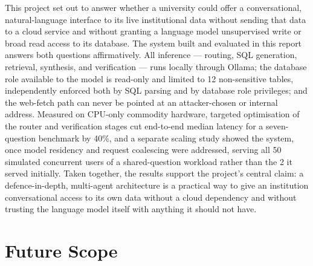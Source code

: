 \documentclass[11pt,a4paper,oneside]{report}
\begin{document}
This project set out to answer whether a university could offer a
conversational, natural-language interface to its live institutional data
without sending that data to a cloud service and without granting a language
model unsupervised write or broad read access to its database. The system
built and evaluated in this report answers both questions affirmatively. All
inference --- routing, SQL generation, retrieval, synthesis, and
verification --- runs locally through Ollama; the database role available to
the model is read-only and limited to 12 non-sensitive tables, independently
enforced both by SQL parsing and by database role privileges; and the
web-fetch path can never be pointed at an attacker-chosen or internal
address. Measured on CPU-only commodity hardware, targeted optimisation of
the router and verification stages cut end-to-end median latency for a
seven-question benchmark by 40\%, and a separate scaling study showed the
system, once model residency and request coalescing were addressed, serving
all 50 simulated concurrent users of a shared-question workload rather than
the 2 it served initially. Taken together, the results support the
project's central claim: a defence-in-depth, multi-agent architecture is a
practical way to give an institution conversational access to its own data
without a cloud dependency and without trusting the language model itself
with anything it should not have.

\section{Future Scope}
\end{document}

